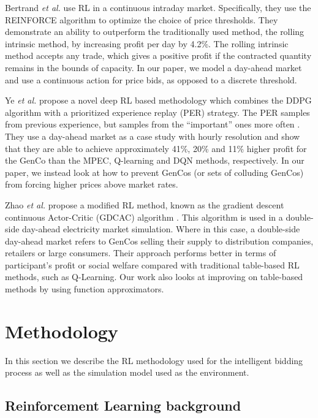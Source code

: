 \documentclass[conference]{IEEEtran}
\begin{document}
Bertrand \textit{et al.} use RL in a continuous intraday market. Specifically, they use the REINFORCE algorithm to optimize the choice of price thresholds. They demonstrate an ability to outperform the traditionally used method, the rolling intrinsic method, by increasing profit per day by 4.2\%. The rolling intrinsic method accepts any trade, which gives a positive profit if the contracted quantity remains in the bounds of capacity. In our paper, we model a day-ahead market and use a continuous action for price bids, as opposed to a discrete threshold.

Ye \textit{et al.} propose a novel deep RL based methodology which combines the DDPG algorithm with a prioritized experience replay (PER) strategy. The PER samples from previous experience, but samples from the ``important'' ones more often \cite{Schaul2016}. They use a day-ahead market as a case study with hourly resolution and show that they are able to achieve approximately 41\%, 20\% and 11\% higher profit for the GenCo than the MPEC, Q-learning and DQN methods, respectively. In our paper, we instead look at how to prevent GenCos (or sets of colluding GenCos) from forcing higher prices above market rates.



Zhao \textit{et al.} propose a modified RL method, known as the gradient descent continuous Actor-Critic (GDCAC) algorithm \cite{Zhao2016}. This algorithm is used in a double-side day-ahead electricity market simulation. Where in this case, a double-side day-ahead market refers to GenCos selling their supply to distribution companies, retailers or large consumers. Their approach performs better in terms of participant's profit or social welfare compared with traditional table-based RL methods, such as Q-Learning. Our work also looks at improving on table-based methods by using function approximators.





\section{Methodology}
\label{sec:material}

In this section we describe the RL methodology used for the intelligent bidding process as well as the simulation model used as the environment.

\subsection{Reinforcement Learning background}
\end{document}
